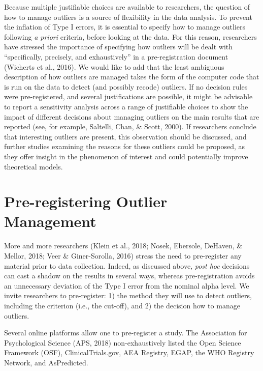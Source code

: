 \documentclass[man,floatsintext]{apa6}
\begin{document}
Because multiple justifiable choices are available to researchers, the question of how to manage outliers is a source of flexibility in the data analysis. To prevent the inflation of Type I errors, it is essential to specify how to manage outliers following \emph{a priori} criteria, before looking at the data. For this reason, researchers have stressed the importance of specifying how outliers will be dealt with \enquote{specifically, precisely, and exhaustively} in a pre-registration document (Wicherts et al., 2016). We would like to add that the least ambiguous description of how outliers are managed takes the form of the computer code that is run on the data to detect (and possibly recode) outliers. If no decision rules were pre-registered, and several justifications are possible, it might be advisable to report a sensitivity analysis across a range of justifiable choices to show the impact of different decisions about managing outliers on the main results that are reported (see, for example, Saltelli, Chan, \& Scott, 2000). If researchers conclude that interesting outliers are present, this observation should be discussed, and further studies examining the reasons for these outliers could be proposed, as they offer insight in the phenomenon of interest and could potentially improve theoretical models.

\hypertarget{pre-registering-outlier-management}{%
\section{Pre-registering Outlier Management}\label{pre-registering-outlier-management}}

More and more researchers (Klein et al., 2018; Nosek, Ebersole, DeHaven, \& Mellor, 2018; Veer \& Giner-Sorolla, 2016) stress the need to pre-register any material prior to data collection. Indeed, as discussed above, \emph{post hoc} decisions can cast a shadow on the results in several ways, whereas pre-registration avoids an unnecessary deviation of the Type I error from the nominal alpha level. We invite researchers to pre-register:
1) the method they will use to detect outliers, including the criterion (i.e., the cut-off), and 2) the decision how to manage outliers.

Several online platforms allow one to pre-register a study. The Association for Psychological Science (APS, 2018) non-exhaustively listed the Open Science Framework (OSF), ClinicalTrials.gov, AEA Registry, EGAP, the WHO Registry Network, and AsPredicted.
\end{document}
